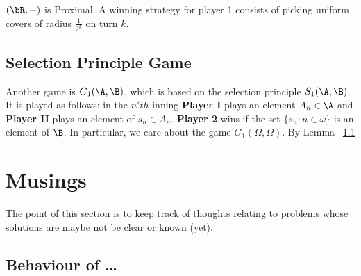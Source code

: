 \documentclass{article}
\begin{document}
\begin{exam}
    \((\bR, +)\) is Proximal. A winning strategy for player 1 consists of picking uniform covers of radius \(\frac{1}{2^k}\) on turn \(k\).
\end{exam}


\subsection{Selection Principle Game}
Another game is \(G_1(\A, \B)\), which is based on the selection principle \(S_1(\A, \B)\). It is played as follows: in the \(n'th\) inning \textbf{Player I} plays an element \(A_n \in \A\) and \textbf{Player II} plays an element of \(s_n \in A_n\). \textbf{Player 2} wins if the set \(\{s_n : n \in \omega\}\) is an element of \(\B\). In particular, we care about the game \(G_1(\Omega, \Omega)\). By Lemma ~\ref{}





\newpage
\section{Musings}
The point of this section is to keep track of thoughts relating to problems whose solutions are maybe not be clear or known (yet). 



\subsection{Behaviour of \dots}
\end{document}
